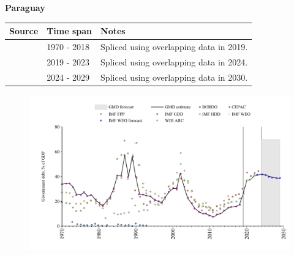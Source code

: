 \documentclass[12pt,a4paper,landscape]{article}
\begin{document}
\begin{adjustbox}{max totalsize={\paperwidth}{\paperheight},center}
\begin{minipage}[t][\textheight][t]{\textwidth}
\vspace*{0.5cm}
{}
\begin{center}
{\Large\bfseries Paraguay}
\end{center}
\vspace{0.5cm}
\begin{table}[H]
\centering
\small
\begin{tabular}{|l|l|l|}
\hline
\textbf{Source} & \textbf{Time span} & \textbf{Notes} \\
\hline
\rowcolor{white}\cite{IMF_GDD}& 1970 - 2018 &Spliced using overlapping data in 2019.\\
\rowcolor{lightgray}\cite{IMF_FPP}& 2019 - 2023 &Spliced using overlapping data in 2024.\\
\rowcolor{white}\cite{IMF_WEO_forecast}& 2024 - 2029 &Spliced using overlapping data in 2030.\\
\hline
\end{tabular}
\end{table}
\begin{figure}[H]
\centering
\includegraphics[width=\textwidth,height=0.6\textheight,keepaspectratio]{graphs/PRY_govdebt_GDP.pdf}
\end{figure}
\end{minipage}
\end{adjustbox}
\end{document}
